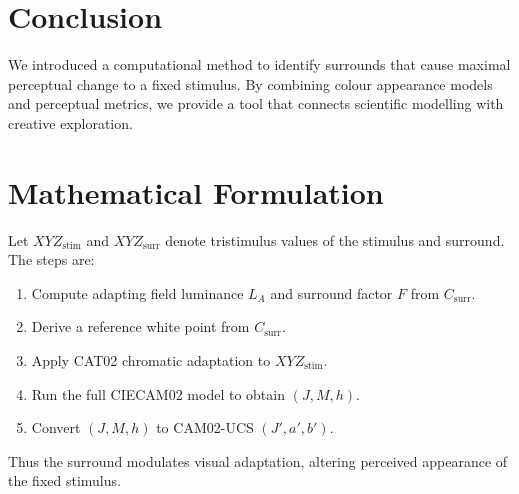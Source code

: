 \documentclass[11pt]{article}
\begin{document}
\section{Conclusion}
We introduced a computational method to identify surrounds that cause maximal perceptual change to a fixed stimulus. By combining colour appearance models and perceptual metrics, we provide a tool that connects scientific modelling with creative exploration.

\appendix
\section{Mathematical Formulation}
Let $XYZ_{\text{stim}}$ and $XYZ_{\text{surr}}$ denote tristimulus values of the stimulus and surround. The steps are:

\begin{enumerate}
  \item Compute adapting field luminance $L_A$ and surround factor $F$ from $C_{\text{surr}}$.
  \item Derive a reference white point from $C_{\text{surr}}$.
  \item Apply CAT02 chromatic adaptation to $XYZ_{\text{stim}}$.
  \item Run the full CIECAM02 model to obtain $(J,M,h)$.
  \item Convert $(J,M,h)$ to CAM02-UCS $(J',a',b')$.
\end{enumerate}

Thus the surround modulates visual adaptation, altering perceived appearance of the fixed stimulus.

\printbibliography
\end{document}

